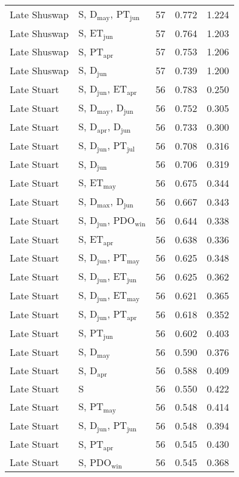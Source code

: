 \begin{longtable}{llrrr}
Late Shuswap & S, D$_\mathrm{may}$, PT$_\mathrm{jun}$ & 57 & 0.772 & 1.224 \\ 
Late Shuswap & S, ET$_\mathrm{jun}$ & 57 & 0.764 & 1.203 \\ 
Late Shuswap & S, PT$_\mathrm{apr}$ & 57 & 0.753 & 1.206 \\ 
Late Shuswap & S, D$_\mathrm{jun}$ & 57 & 0.739 & 1.200 \\ 
Late Stuart & S, D$_\mathrm{jun}$, ET$_\mathrm{apr}$ & 56 & 0.783 & 0.250 \\ 
Late Stuart & S, D$_\mathrm{may}$, D$_\mathrm{jun}$ & 56 & 0.752 & 0.305 \\ 
Late Stuart & S, D$_\mathrm{apr}$, D$_\mathrm{jun}$ & 56 & 0.733 & 0.300 \\ 
Late Stuart & S, D$_\mathrm{jun}$, PT$_\mathrm{jul}$ & 56 & 0.708 & 0.316 \\ 
Late Stuart & S, D$_\mathrm{jun}$ & 56 & 0.706 & 0.319 \\ 
Late Stuart & S, ET$_\mathrm{may}$ & 56 & 0.675 & 0.344 \\ 
Late Stuart & S, D$_\mathrm{max}$, D$_\mathrm{jun}$ & 56 & 0.667 & 0.343 \\ 
Late Stuart & S, D$_\mathrm{jun}$, PDO$_\mathrm{win}$ & 56 & 0.644 & 0.338 \\ 
Late Stuart & S, ET$_\mathrm{apr}$ & 56 & 0.638 & 0.336 \\ 
Late Stuart & S, D$_\mathrm{jun}$, PT$_\mathrm{may}$ & 56 & 0.625 & 0.348 \\ 
Late Stuart & S, D$_\mathrm{jun}$, ET$_\mathrm{jun}$ & 56 & 0.625 & 0.362 \\ 
Late Stuart & S, D$_\mathrm{jun}$, ET$_\mathrm{may}$ & 56 & 0.621 & 0.365 \\ 
Late Stuart & S, D$_\mathrm{jun}$, PT$_\mathrm{apr}$ & 56 & 0.618 & 0.352 \\ 
Late Stuart & S, PT$_\mathrm{jun}$ & 56 & 0.602 & 0.403 \\ 
Late Stuart & S, D$_\mathrm{may}$ & 56 & 0.590 & 0.376 \\ 
Late Stuart & S, D$_\mathrm{apr}$ & 56 & 0.588 & 0.409 \\ 
Late Stuart & S & 56 & 0.550 & 0.422 \\
Late Stuart & S, PT$_\mathrm{may}$ & 56 & 0.548 & 0.414 \\ 
Late Stuart & S, D$_\mathrm{jun}$, PT$_\mathrm{jun}$ & 56 & 0.548 & 0.394 \\ 
Late Stuart & S, PT$_\mathrm{apr}$ & 56 & 0.545 & 0.430 \\ 
Late Stuart & S, PDO$_\mathrm{win}$ & 56 & 0.545 & 0.368 \\ 

\end{longtable}
